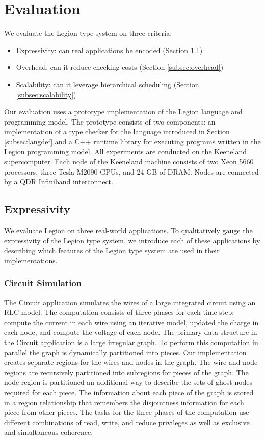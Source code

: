
\section{Evaluation}
\label{sec:evaluation}

We evaluate the Legion type system on three criteria:
\begin{itemize}
\item Expressivity: can real applications be encoded (Section \ref{subsec:expressivity})
\item Overhead: can it reduce checking costs (Section \ref{subsec:overhead})
\item Scalability: can it leverage hierarchical scheduling (Section \ref{subsec:scalability})
\end{itemize}
Our evaluation uses a prototype implementation of the Legion language and programming model.
The prototype consists of two components: an implementation of a type checker
for the language introduced in Section \ref{subsec:langdef} and a C++ runtime library
for executing programs written in the Legion programming model\cite{Legion12}.  All experiments
are conducted on the Keeneland supercomputer\cite{Keeneland}.  Each node of the Keeneland
machine consists of two Xeon 5660 processors, three Tesla M2090 GPUs, and 24 GB of DRAM.  Nodes
are connected by a QDR Infiniband interconnect.

\subsection{Expressivity}
\label{subsec:expressivity}
We evaluate Legion on three real-world applications.  To qualitatively gauge the 
expressivity of the Legion type system, we introduce each of these applications
by describing which features of the Legion type system are used in their implementations.

\subsubsection{Circuit Simulation}
\label{subsec:circuit}
The Circuit application simulates the wires of a large integrated circuit using an RLC
model.  The computation consists of three phases for each time step: compute the current in each wire using
an iterative model, updated the charge in each node, and compute the voltage of each node.
The primary data structure in the Circuit application is a large irregular graph.  To perform 
this computation in parallel the graph is dynamically partitioned into pieces.  
Our implementation creates separate regions for the wires and
nodes in the graph.  The wire and node regions are recursively partitioned into
subregions for pieces of the graph.  The node region is partitioned an additional way to 
describe the sets of ghost nodes required for each piece.  
The information about each piece of the graph is stored
in a region relationship that remembers the disjointness information for each piece
from other pieces.  The tasks for the three phases of the computation use different combinations of
read, write, and reduce privileges as well as exclusive and simultaneous coherence.

